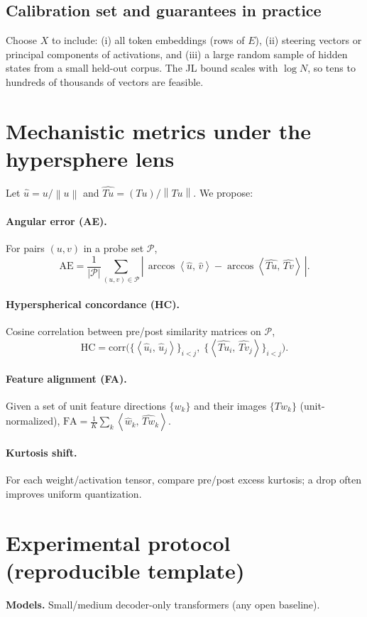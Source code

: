 \documentclass{article}
\newcommand{\norm}[1]{\left\lVert #1 \right\rVert}
\newcommand{\ip}[2]{\left\langle #1,\,#2 \right\rangle}
\begin{document}
\subsection{Calibration set and guarantees in practice}
Choose $X$ to include: (i) all token embeddings (rows of $E$), (ii) steering
vectors or principal components of activations, and (iii) a large random sample
of hidden states from a small held-out corpus. The JL bound scales with
$\log N$, so tens to hundreds of thousands of vectors are feasible.

\section{Mechanistic metrics under the hypersphere lens}
\label{sec:metrics}
Let $\hat{u}=u/\norm{u}$ and $\widehat{Tu}=(Tu)/\norm{Tu}$. We propose:

\paragraph{Angular error (AE).}
For pairs $(u,v)$ in a probe set $\mathcal{P}$,
\[
\mathrm{AE} = \frac{1}{|\mathcal{P}|}\sum_{(u,v)\in\mathcal{P}}
\left|\,\arccos\ip{\hat{u}}{\hat{v}} - \arccos\ip{\widehat{Tu}}{\widehat{Tv}}\,\right|.
\]

\paragraph{Hyperspherical concordance (HC).}
Cosine correlation between pre/post similarity matrices on $\mathcal{P}$,
\[
\mathrm{HC} = \mathrm{corr}\bigl(\{\ip{\hat{u}_i}{\hat{u}_j}\}_{i<j},\;
\{\ip{\widehat{Tu}_i}{\widehat{Tv}_j}\}_{i<j}\bigr).
\]

\paragraph{Feature alignment (FA).}
Given a set of unit feature directions $\{w_k\}$ and their images
$\{Tw_k\}$ (unit-normalized), $\mathrm{FA}=\frac{1}{K}\sum_k \ip{\hat{w}_k}{\widehat{Tw}_k}$.

\paragraph{Kurtosis shift.}
For each weight/activation tensor, compare pre/post excess kurtosis; a drop
often improves uniform quantization.

\section{Experimental protocol (reproducible template)}
\label{sec:protocol}
\textbf{Models.} Small/medium decoder-only transformers (any open baseline).
\end{document}
